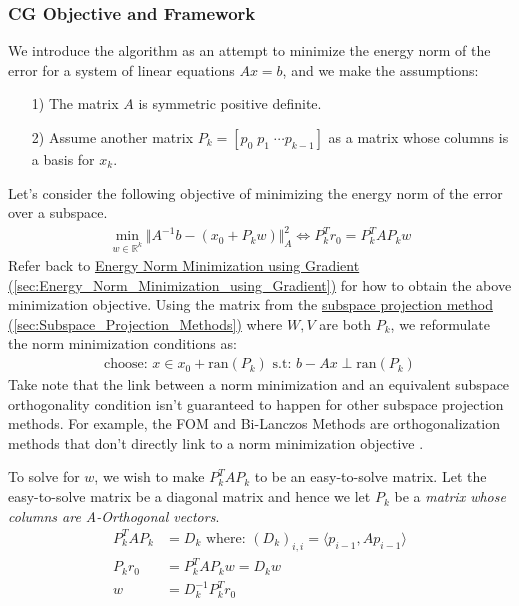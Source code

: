 \documentclass[]{article}
\theoremstyle{definition}
\begin{document}
        \subsubsection{CG Objective and Framework}
            We introduce the algorithm as an attempt to minimize the energy norm of the error for a system of linear equations $Ax = b$, and we make the assumptions: 
            \begin{itemize}
                \item [1)] The matrix $A$ is symmetric positive definite.  
                \item [2)] Assume another matrix $P_k = [p_0 \;p_1\;\cdots p_{k-1}]$ as a matrix whose columns is a basis for $x_k$.
            \end{itemize}
            Let's consider the following objective of minimizing the energy norm of the error over a subspace. 
            \begin{align}
                \min_{w \in \mathbb{R}^k}\Vert 
                    A^{-1}b - (x_0 + P_kw)
                \Vert_A^2 \iff P^T_kr_0 = P_k^TAP_kw
            \end{align}
            Refer back to \hyperref[sec:Energy_Norm_Minimization_using_Gradient]{Energy Norm Minimization using Gradient (\ref*{sec:Energy_Norm_Minimization_using_Gradient})} for how to obtain the above minimization objective. Using the matrix from the \hyperref[sec:Subspace_Projection_Methods]{subspace projection method (\ref*{sec:Subspace_Projection_Methods})} where $W, V$ are both $P_k$, we reformulate the norm minimization conditions as: 
            \begin{align}
                \text{choose: }x \in x_0 + \text{ran}(P_k) \text{ s.t: } b - Ax \perp \text{ran}(P_k)    
            \end{align}
            Take note that the link between a norm minimization and an equivalent subspace orthogonality condition isn't guaranteed to happen for other subspace projection methods. For example, the FOM and Bi-Lanczos Methods are orthogonalization methods that don't directly link to a norm minimization objective \cite{paper:FOM}. 
            \par
            To solve for $w$, we wish to make $P_k^TAP_k$ to be an easy-to-solve matrix. Let the easy-to-solve matrix be a diagonal matrix and hence we let $P_k$ be a \textit{matrix whose columns are A-Orthogonal vectors}.
            \begin{align}
                P^T_kAP_k &= D_k \text{ where: } (D_k)_{i,i} = \langle p_{i - 1}, Ap_{i - 1}\rangle
                \\
                P_kr_0 &= P^T_kAP_kw = D_kw
                \\
                w &= D^{-1}_kP_k^Tr_0
            \end{align}
\end{document}
